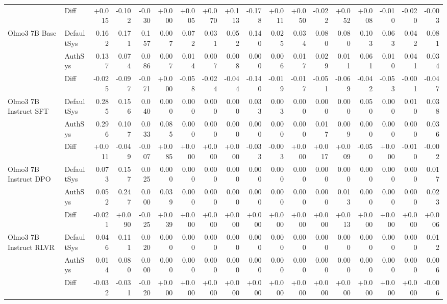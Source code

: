 \begin{table}[htbp]
{\begin{tabular}{llrrrrrrrrrrrrrrrr}
\rowcolor{Gray} & Diff & +0.015 & -0.102 & -0.030 & +0.000 & +0.005 & +0.070 & +0.113 & -0.178 & +0.011 & +0.050 & -0.022 & +0.052 & +0.008 & -0.010 & -0.020 & -0.003 \\
Olmo3 7B Base & DefaultSys & 0.162 & 0.171 & 0.157 & 0.007 & 0.072 & 0.031 & 0.052 & 0.140 & 0.025 & 0.034 & 0.080 & 0.080 & 0.103 & 0.063 & 0.042 & 0.081 \\
 & AuthSys & 0.137 & 0.074 & 0.086 & 0.007 & 0.014 & 0.007 & 0.008 & 0.000 & 0.006 & 0.017 & 0.029 & 0.011 & 0.061 & 0.010 & 0.041 & 0.034 \\
\rowcolor{Gray} & Diff & -0.025 & -0.097 & -0.071 & +0.000 & -0.058 & -0.024 & -0.044 & -0.140 & -0.019 & -0.017 & -0.051 & -0.069 & -0.042 & -0.053 & -0.001 & -0.047 \\
Olmo3 7B Instruct SFT & DefaultSys & 0.285 & 0.156 & 0.040 & 0.000 & 0.000 & 0.000 & 0.000 & 0.033 & 0.003 & 0.000 & 0.000 & 0.000 & 0.050 & 0.000 & 0.010 & 0.038 \\
 & AuthSys & 0.296 & 0.107 & 0.033 & 0.085 & 0.000 & 0.000 & 0.000 & 0.000 & 0.000 & 0.000 & 0.017 & 0.009 & 0.000 & 0.000 & 0.000 & 0.036 \\
\rowcolor{Gray} & Diff & +0.011 & -0.049 & -0.007 & +0.085 & +0.000 & +0.000 & +0.000 & -0.033 & -0.003 & +0.000 & +0.017 & +0.009 & -0.050 & +0.000 & -0.010 & -0.002 \\
Olmo3 7B Instruct DPO & DefaultSys & 0.073 & 0.157 & 0.025 & 0.000 & 0.000 & 0.000 & 0.000 & 0.000 & 0.000 & 0.000 & 0.000 & 0.000 & 0.000 & 0.000 & 0.000 & 0.017 \\
 & AuthSys & 0.052 & 0.247 & 0.000 & 0.039 & 0.000 & 0.000 & 0.000 & 0.000 & 0.000 & 0.000 & 0.000 & 0.013 & 0.000 & 0.000 & 0.000 & 0.023 \\
\rowcolor{Gray} & Diff & -0.021 & +0.090 & -0.025 & +0.039 & +0.000 & +0.000 & +0.000 & +0.000 & +0.000 & +0.000 & +0.000 & +0.013 & +0.000 & +0.000 & +0.000 & +0.006 \\
Olmo3 7B Instruct RLVR & DefaultSys & 0.046 & 0.111 & 0.020 & 0.000 & 0.000 & 0.000 & 0.000 & 0.000 & 0.000 & 0.000 & 0.000 & 0.000 & 0.000 & 0.000 & 0.000 & 0.012 \\
 & AuthSys & 0.014 & 0.080 & 0.000 & 0.000 & 0.000 & 0.000 & 0.000 & 0.000 & 0.000 & 0.000 & 0.000 & 0.000 & 0.000 & 0.000 & 0.000 & 0.006 \\
\rowcolor{Gray} & Diff & -0.032 & -0.031 & -0.020 & +0.000 & +0.000 & +0.000 & +0.000 & +0.000 & +0.000 & +0.000 & +0.000 & +0.000 & +0.000 & +0.000 & +0.000 & -0.006 \\
\bottomrule
\end{tabular}
}%
\end{table}